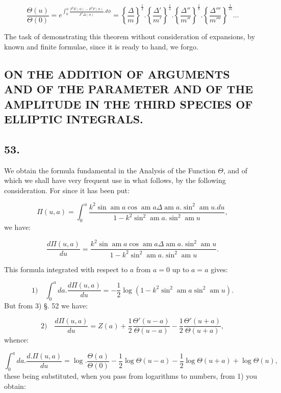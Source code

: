 \documentclass{article}
\begin{document}
\[
\frac{\Theta(u)}{\Theta(0)}=e^{\int_{0}^{\phi}\frac{F^{\mathrm{I}}E(\phi)-E^{\mathrm{I}}F(\phi)}{F^{\mathrm{I}}\Delta(\phi)}.d\phi}=\left\{\frac{\Delta}{m}\right\}^{\frac{1}{2}}.\left\{\frac{\Delta'}{m'}\right\}^{\frac{1}{4}}.\left\{\frac{\Delta''}{m''}\right\}^{\frac{1}{8}}.\left\{\frac{\Delta'''}{m'''}\right\}^{\frac{1}{16}}\ldots
\]

The task of demonstrating this theorem without consideration of expansions, by known and finite formulae, since it is ready to hand, we forgo.

\subsection*{ON THE ADDITION OF ARGUMENTS AND OF THE PARAMETER AND OF THE AMPLITUDE IN THE THIRD SPECIES OF ELLIPTIC INTEGRALS.}

\subsection*{53.}

We obtain the formula fundamental in the Analysis of the Function $\Theta$, and of which we shall have very frequent use in what follows, by the following consideration. For since it has been put:

\[
\Pi(u,a)=\int_{0}^{u}\frac{k^{2}\sin\operatorname{am}a\cos\operatorname{am}a\Delta\operatorname{am}a.\sin^{2}\operatorname{am}u.du}{1-k^{2}\sin^{2}\operatorname{am}a.\sin^{2}\operatorname{am}u},
\]
we have:

\[
\frac{d\Pi(u,a)}{du}=\frac{k^{2}\sin\operatorname{am}a\cos\operatorname{am}a\Delta\operatorname{am}a.\sin^{2}\operatorname{am}u}{1-k^{2}\sin^{2}\operatorname{am}a.\sin^{2}\operatorname{am}u}.
\]

This formula integrated with respect to $a$ from $a=0$ up to $a=a$ gives:

\[
\text{1)}\quad \int_{0}^{a}da.\frac{d\Pi(u,a)}{du}=-\frac{1}{2}\log\left(1-k^{2}\sin^{2}\operatorname{am}a\sin^{2}\operatorname{am}u\right).
\]
But from 3) §. 52 we have:

\[
\text{2)}\quad \frac{d\Pi(u,a)}{du}=Z(a)+\frac{1}{2}\frac{\Theta'(u-a)}{\Theta(u-a)}-\frac{1}{2}\frac{\Theta'(u+a)}{\Theta(u+a)},
\]
whence:

\[
\int_{0}^{a}da.\frac{d.\Pi(u,a)}{du}=\log.\frac{\Theta(a)}{\Theta(0)}-\frac{1}{2}\log\Theta(u-a)-\frac{1}{2}\log\Theta(u+a)+\log\Theta(u),
\]
these being substituted, when you pass from logarithms to numbers, from 1) you obtain:
\end{document}
